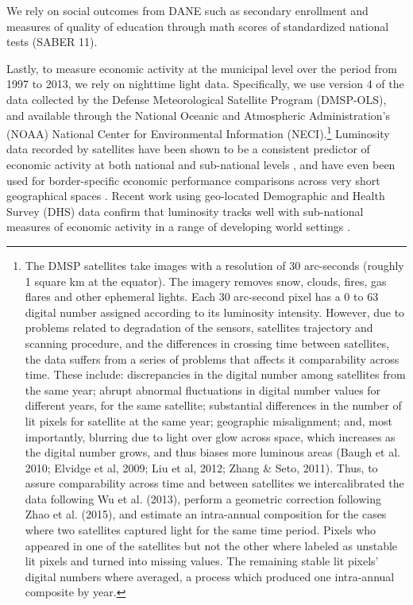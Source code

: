We rely on social outcomes from DANE such as secondary enrollment and measures of quality of education through math scores of standardized national tests (SABER 11).  

Lastly, to measure economic activity at the municipal level over the period from 1997 to 2013, we rely on nighttime light data. Specifically, we use version 4 of the data collected by the Defense Meteorological Satellite Program (DMSP-OLS), and available through the National Oceanic and Atmospheric Administration's (NOAA) National Center for Environmental Information (NECI).\footnote{The DMSP satellites take images with a resolution of 30 arc-seconds (roughly 1 square km at the equator). The imagery removes snow, clouds, fires, gas flares and other ephemeral lights. Each 30 arc-second pixel has a 0 to 63 digital number assigned according to its luminosity intensity. However, due to problems related to degradation of the sensors, satellites trajectory and scanning procedure, and the differences in crossing time between satellites, the data suffers from a series of problems that affects it comparability across time. These include: discrepancies in the digital number among satellites from the same year; abrupt abnormal fluctuations in digital number values for different years, for the same satellite; substantial differences in the number of lit pixels for satellite at the same year; geographic misalignment; and, most importantly, blurring due to light over glow across space, which increases as the digital number grows, and thus biases more luminous areas (Baugh et al. 2010; Elvidge et al, 2009; Liu et al, 2012; Zhang \& Seto, 2011). Thus, to assure comparability across time and between satellites we intercalibrated the data following Wu et al. (2013), perform a geometric correction following  Zhao et al. (2015), and estimate an intra-annual composition for the cases where two satellites captured light for the same time period. Pixels who appeared in one of the satellites but not the other where labeled as unstable lit pixels and turned into missing values. The remaining stable lit pixels' digital numbers where averaged, a process which produced one intra-annual composite by year.}   Luminosity data recorded by satellites have been shown to be a consistent predictor of economic activity at both national and sub-national levels \citep{vernon11, bleakley2012, michalopoulos2013, storeygard2012, pinkosalai2014}, and have even been used for border-specific economic performance comparisons across very short geographical spaces \citep{pinko2013}. Recent work using geo-located Demographic and Health Survey (DHS) data confirm that luminosity tracks well with sub-national measures of economic activity in a range of developing world settings \citep{weidmann2017}.

